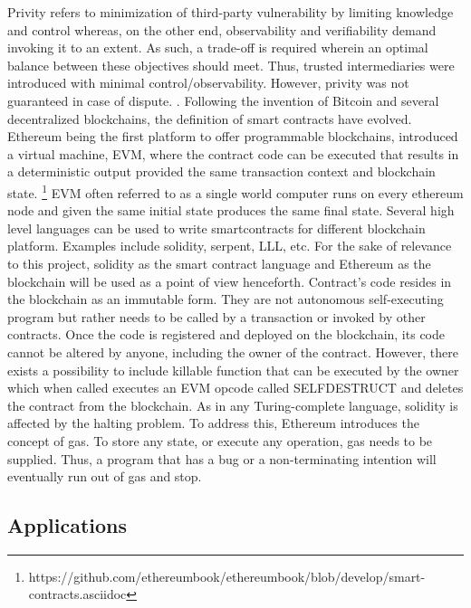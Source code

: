 Privity refers to minimization of third-party vulnerability by limiting
knowledge and control whereas, on the other end, observability and
verifiability demand invoking it to an extent. As such, a trade-off is
required wherein an optimal balance between these objectives should meet. Thus,
trusted intermediaries were introduced with minimal control/observability.
However, privity was not guaranteed in case of dispute. 
\cite{szabo1997formalizing}.
Following the invention of Bitcoin and several decentralized blockchains, the
definition of smart contracts have evolved. Ethereum being the first platform to
offer programmable blockchains, introduced a virtual machine, EVM, where the
contract code can be executed that results in a deterministic output provided
the same transaction context and blockchain state. 
\footnote{https://github.com/ethereumbook/ethereumbook/blob/develop/smart-contracts.asciidoc}
EVM often referred to as a single world computer runs on every ethereum node
and given the same initial state produces the same final state. Several high
level languages can be used to write smartcontracts for different blockchain
platform. Examples include solidity, serpent, LLL, etc.  For the sake of
relevance to this project, solidity as the smart contract language and Ethereum
as the blockchain will be used as a point of view henceforth. Contract's code
resides in the blockchain as an immutable form.  They are not autonomous
self-executing program but rather needs to be called by a transaction or
invoked by other contracts. Once the code is registered and deployed on the
blockchain, its code cannot be altered by anyone, including the owner of the
contract. However, there exists a possibility to include killable function that
can be executed by the owner which when called executes an EVM opcode called
SELFDESTRUCT and deletes the contract from the blockchain.  As in any
Turing-complete language, solidity is affected by the halting problem.  To
address this, Ethereum introduces the concept of gas. To store any state, or
execute any operation, gas needs to be supplied. Thus, a program that has a bug
or a non-terminating intention will eventually run out of gas and
stop.\cite{whataresmartcontracts} 

\subsection{Applications}




